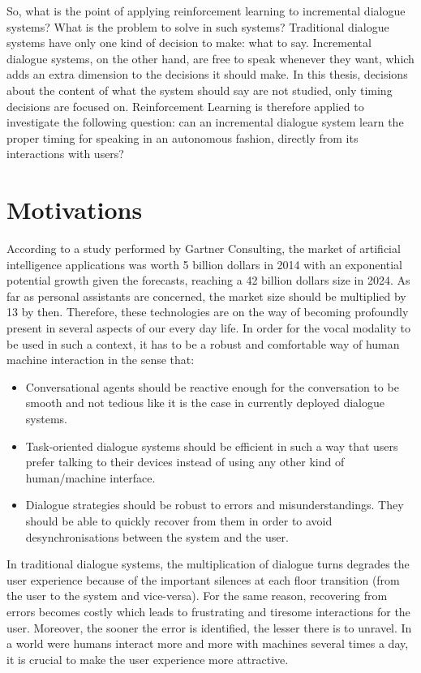         So, what is the point of applying reinforcement learning to incremental dialogue systems? What is the problem to solve in such systems? Traditional dialogue systems have only one kind of decision to make: what to say. Incremental dialogue systems, on the other hand, are free to speak whenever they want, which adds an extra dimension to the decisions it should make. In this thesis, decisions about the content of what the system should say are not studied, only timing decisions are focused on. Reinforcement Learning is therefore applied to investigate the following question: can an incremental dialogue system learn the proper timing for speaking in an autonomous fashion, directly from its interactions with users?
				
\section*{Motivations}

				According to a study performed by Gartner Consulting, the market of artificial intelligence applications was worth 5 billion dollars in 2014 with an exponential potential growth given the forecasts, reaching a 42 billion dollars size in 2024. As far as personal assistants are concerned, the market size should be multiplied by 13 by then. Therefore, these technologies are on the way of becoming profoundly present in several aspects of our every day life. In order for the vocal modality to be used in such a context, it has to be a robust and comfortable way of human machine interaction in the sense that:
				
				\begin{itemize}
					\item Conversational agents should be reactive enough for the conversation to be smooth and not tedious like it is the case in currently deployed dialogue systems.
					\item Task-oriented dialogue systems should be efficient in such a way that users prefer talking to their devices instead of using any other kind of human/machine interface.
					\item Dialogue strategies should be robust to errors and misunderstandings. They should be able to quickly recover from them in order to avoid desynchronisations between the system and the user.
				\end{itemize}
				
				In traditional dialogue systems, the multiplication of dialogue turns degrades the user experience because of the important silences at each floor transition (from the user to the system and vice-versa). For the same reason, recovering from errors becomes costly which leads to frustrating and tiresome interactions for the user. Moreover, the sooner the error is identified, the lesser there is to unravel. In a world were humans interact more and more with machines several times a day, it is crucial to make the user experience more attractive.
				
